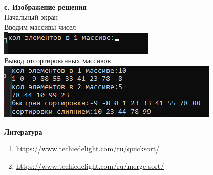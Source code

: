 \documentclass[a4paper, 12pt]{article}
\begin{document}
\begin{flushleft}
{\textbf{с. Изображение решения}}\\
Начальный экран\\
Вводим массивы чисел\\
 \includegraphics[scale=0.9]{2.jpg}\\
Вывод отсортированных массивов
 \includegraphics[scale=0.9]{3.jpg}\\

\end{flushleft}
\newpage
\begin{flushleft}
\textbf{{\Large Литература}}\\
\begin{enumerate}
\item \url{https://www.techiedelight.com/ru/quicksort/}
\item \url{https://www.techiedelight.com/ru/merge-sort/}
\end{enumerate}
\end{flushleft}
\end{document}

